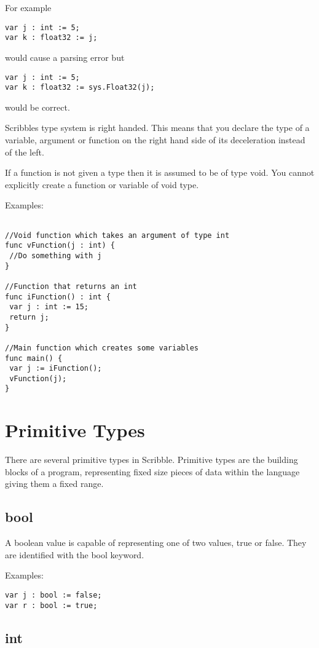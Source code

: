 \documentclass[]{final_report}
\begin{document}
For example
\begin{verbatim}
var j : int := 5;
var k : float32 := j;
\end{verbatim}
would cause a parsing error but
\begin{verbatim}
var j : int := 5;
var k : float32 := sys.Float32(j);
\end{verbatim}
would be correct.


Scribbles type system is right handed. This means that you declare the type of a variable, argument or function on the right hand side of its deceleration instead of the left.

If a function is not given a type then it is assumed to be of type void. You cannot explicitly create a function or variable of void type.

Examples:
\begin{verbatim}

//Void function which takes an argument of type int
func vFunction(j : int) {
 //Do something with j
}

//Function that returns an int
func iFunction() : int {
 var j : int := 15;
 return j;
}

//Main function which creates some variables
func main() {
 var j := iFunction();
 vFunction(j);
}
\end{verbatim}

\section{Primitive Types}

There are several primitive types in Scribble. Primitive types are the building blocks of a program, representing fixed size pieces of data within the language giving them a fixed range.

\subsection{bool}

A boolean value is capable of representing one of two values, true or false. They are identified with the bool keyword.

Examples:
\begin{verbatim}
var j : bool := false;
var r : bool := true;
\end{verbatim}

\subsection{int}
\end{document}
